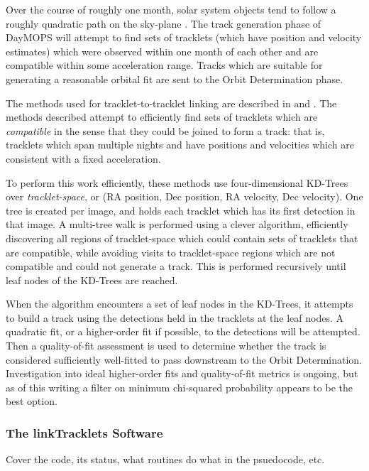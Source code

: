 \documentclass[12pt,preprint]{aastex}
\begin{document}
Over the course of roughly one month, solar system objects tend to
follow a roughly quadratic path on the sky-plane
\citep{kubica_thesis}.  The track generation phase of DayMOPS will
attempt to find sets of tracklets (which have position and velocity
estimates) which were observed within one month of each other and are
compatible within some acceleration range.  Tracks which are
suitable for generating a reasonable orbital fit are sent to the Orbit
Determination phase.

The methods used for tracklet-to-tracklet linking are described in
\citet{kubica_thesis} and \citet{Kubica:2005:MTA:1081870.1081889}.
The methods described attempt to efficiently find sets of tracklets
which are \textit{compatible} in the sense that they could be joined
to form a track: that is, tracklets which span multiple nights and
have positions and velocities which are consistent with a fixed
acceleration.  

To perform this work efficiently, these methods use four-dimensional
KD-Trees over \textit{tracklet-space}, or (RA position, Dec position,
RA velocity, Dec velocity). One tree is created per image, and holds
each tracklet which has its first detection in that image.  A
multi-tree walk is performed using a clever algorithm, efficiently
discovering all regions of tracklet-space which could contain sets of
tracklets that are compatible, while avoiding visits to tracklet-space
regions which are not compatible and could not generate a track.  This
is performed recursively until leaf nodes of the KD-Trees are reached.


When the algorithm encounters a set of leaf nodes in the KD-Trees, it
attempts to build a track using the detections held in the tracklets
at the leaf nodes.  A quadratic fit, or a higher-order fit if
possible, to the detections will be attempted.  Then a quality-of-fit
assessment is used to determine whether the track is considered
sufficiently well-fitted to pass downstream to the Orbit
Determination.  Investigation into ideal higher-order fits and
quality-of-fit metrics is ongoing, but as of this writing a filter on
minimum chi-squared probability appears to be the best option.

\subsubsection{The linkTracklets Software}
Cover the code, its status, what routines do what in the psuedocode, etc.
\end{document}

